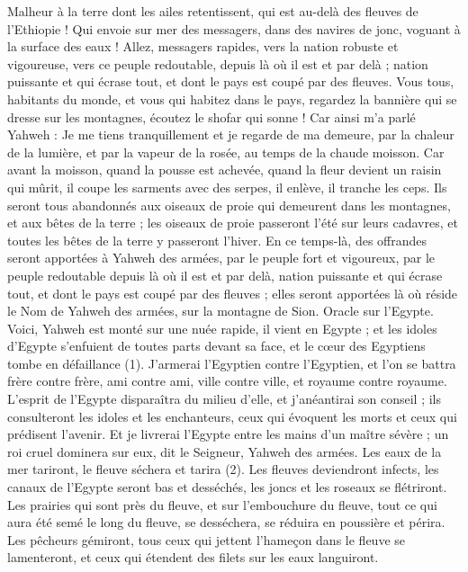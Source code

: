 \begin{multicols}{2}
\VerseOne{}Malheur à la terre dont les ailes retentissent, qui est au-delà des fleuves de l’Ethiopie !
Qui envoie sur mer des messagers, dans des navires de jonc, voguant à la surface des eaux ! Allez, messagers rapides, vers la nation robuste et vigoureuse, vers ce peuple redoutable, depuis là où il est et par delà ; nation puissante et qui écrase tout, et dont le pays est coupé par des fleuves.
Vous tous, habitants du monde, et vous qui habitez dans le pays, regardez la bannière qui se dresse sur les montagnes, écoutez le shofar qui sonne !
Car ainsi m'a parlé Yahweh : Je me tiens tranquillement et je regarde de ma demeure, par la chaleur de la lumière, et par la vapeur de la rosée, au temps de la chaude moisson.
Car avant la moisson, quand la pousse est achevée, quand la fleur devient un raisin qui mûrit, il coupe les sarments avec des serpes, il enlève, il tranche les ceps.
Ils seront tous abandonnés aux oiseaux de proie qui demeurent dans les montagnes, et aux bêtes de la terre ; les oiseaux de proie passeront l’été sur leurs cadavres, et toutes les bêtes de la terre y passeront l’hiver.
En ce temps-là, des offrandes seront apportées à Yahweh des armées, par le peuple fort et vigoureux, par le peuple redoutable depuis là où il est et par delà, nation puissante et qui écrase tout, et dont le pays est coupé par des fleuves ; elles seront apportées là où réside le Nom de Yahweh des armées, sur la montagne de Sion.
\VerseOne{}Oracle sur l'Egypte. Voici, Yahweh est monté sur une nuée rapide, il vient en Egypte ; et les idoles d'Egypte s'enfuient de toutes parts devant sa face, et le cœur des Egyptiens tombe en défaillance (1).
J’armerai l'Egyptien contre l'Egyptien, et l’on se battra frère contre frère, ami contre ami, ville contre ville, et royaume contre royaume.
L'esprit de l'Egypte disparaîtra du milieu d'elle, et j’anéantirai son conseil ; ils consulteront les idoles et les enchanteurs, ceux qui évoquent les morts et ceux qui prédisent l’avenir.
Et je livrerai l'Egypte entre les mains d'un maître sévère ; un roi cruel dominera sur eux, dit le Seigneur, Yahweh des armées.
Les eaux de la mer tariront, le fleuve séchera et tarira (2).
Les fleuves deviendront infects, les canaux de l’Egypte seront bas et desséchés, les joncs et les roseaux se flétriront.
Les prairies qui sont près du fleuve, et sur l'embouchure du fleuve, tout ce qui aura été semé le long du fleuve, se desséchera, se réduira en poussière et périra.
Les pêcheurs gémiront, tous ceux qui jettent l'hameçon dans le fleuve se lamenteront, et ceux qui étendent des filets sur les eaux languiront.

\end{multicols}
